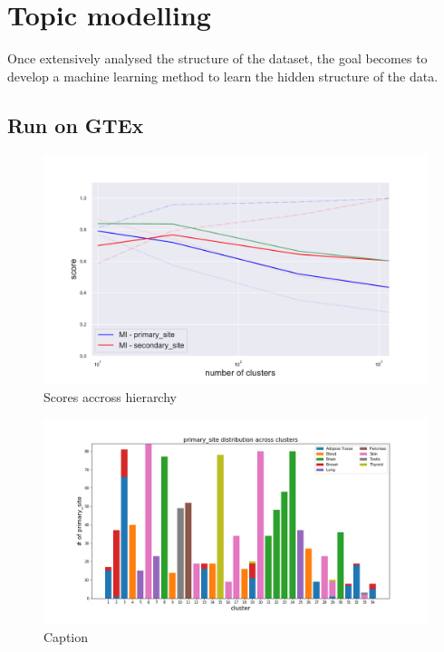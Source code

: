 \chapter{Topic modelling}\label{ch:topicmodelling}
Once extensively analysed the structure of the dataset, the goal becomes to develop a machine learning method to learn the hidden structure of the data.  






\section{Run on GTEx}
\begin{figure}[htb!]
    \centering
    \includegraphics[width=0.9\linewidth]{pictures/topic/gtex/oversigma_10tissue/metric_scores.pdf}
    \caption{Scores accross hierarchy}
    \label{fig:my_label}
\end{figure}

\begin{figure}[htb!]
    \centering
    \includegraphics[width=0.9\linewidth]{pictures/topic/gtex/oversigma_10tissue/clustercomposition_l2_primary_site.png}
    \caption{Caption}
    \label{fig:topic/gtex/oversigma_10tissue/clustercomposition_l2_primary_site}
\end{figure}


